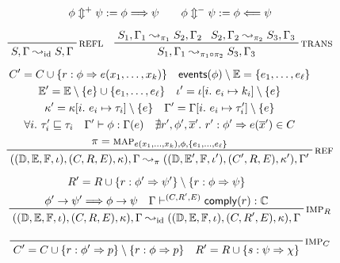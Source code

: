 \begin{figure}[t]
    \begin{gather*}
        \phi \Updownarrow^+ \psi := \phi \Longrightarrow \psi\qquad
        \phi \Updownarrow^- \psi := \phi \Longleftarrow \psi \\[5pt]
        \prftree[r]
            {\textsc{refl}}
            {S,\Gamma \leadsto_{\mathrm{id}} S,\Gamma}\quad
        \prftree[r]
            {\textsc{trans}}
            {S_1,\Gamma_1 \leadsto_{\pi_1} S_2,\Gamma_2}
            {S_2,\Gamma_2 \leadsto_{\pi_2} S_3,\Gamma_3}
            {S_1,\Gamma_1 \leadsto_{\pi_1 \circ \pi_2} S_3,\Gamma_3}\\[5pt]
        \prftree[r]
            {\textsc{ref}}
            {
              \prfStackPremises
              {C' = C \cup \{r : \phi \Rightarrow e(x_1,\dots,x_k)\} \quad
                  \mathsf{events}(\phi) \setminus \Events=\{e_1,\dots,e_\ell\}}
              {\Events' = \Events \setminus \{e\} \cup \{e_1,\dots,e_\ell\} \quad
                  \iota' = \iota[i.~e_i \mapsto k_i] \setminus \{e\}}
              {\kappa' = \kappa[i.~e_i \mapsto \tau_i] \setminus \{e\} \quad
                  \Gamma' = \Gamma[i.~e_i \mapsto \tau'_i] \setminus \{e\} }
              {\forall i.~\tau'_i \sqsubseteq \tau_i \quad \Gamma' \vdash \phi : \Gamma(e)
                  \quad
                  \nexists r', \phi', \overline{x}'.~r': \phi' \Rightarrow e(\overline{x}') \in C}
              {\pi = \textsc{\textsf{map}}_{e(x_1,\dots,x_k),\phi,\{e_1,\dots,e_\ell\}}}
            }
            {((\Domain,\Events,\Functions,\iota),(C,R,E),\kappa),\Gamma
            \leadsto_\pi
            ((\Domain,\Events',\Functions,\iota'),(C',R,E),\kappa'),\Gamma'}\\[5pt]
        \prftree[r]
            {$\textsc{imp}_R$}
            {
                \prfStackPremises
                {R' = R \cup \{r : \phi' \Rightarrow \psi' \}
                    \setminus \{r : \phi \Rightarrow \psi\}}
                {\phi' \to \psi' \Longrightarrow \phi \to \psi \quad
                \Gamma \vdash^{(C,R',E)} \comply(r) : \Cau}
            }    
            {((\Domain,\Events,\Functions,\iota),(C,R,E),\kappa),\Gamma
            \leadsto_{\mathrm{id}}
            ((\Domain,\Events,\Functions,\iota),(C,R',E),\kappa),\Gamma}\\[5pt]
        \prftree[r]
            {$\textsc{imp}_C$}
            {
              \prfStackPremises
              {C' = C \cup \{ r: \phi' \Rightarrow p \}
                  \setminus \{ r : \phi \Rightarrow p \} \quad
                R' = R \cup \{ s : \psi \Rightarrow \chi \}}
}
\end{gather*}
\end{figure}
